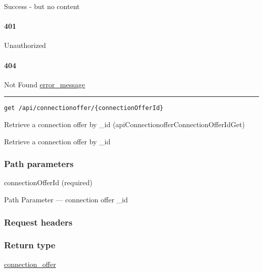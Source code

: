 Success - but no content \protect\hyperlink{}{}

\hypertarget{section-361}{%
\paragraph{401}\label{section-361}}

Unauthorized \protect\hyperlink{}{}

\hypertarget{section-362}{%
\paragraph{404}\label{section-362}}

Not Found \protect\hyperlink{error_message}{error\_message}

\begin{center}\rule{0.5\linewidth}{\linethickness}\end{center}

\protect\hypertarget{apiConnectionofferConnectionOfferIdGet}{}{}

\begin{verbatim}
get /api/connectionoffer/{connectionOfferId}
\end{verbatim}

Retrieve a connection offer by \_id
({apiConnectionofferConnectionOfferIdGet})

Retrieve a connection offer by \_id

\hypertarget{path-parameters-58}{%
\subsubsection{Path parameters}\label{path-parameters-58}}

connectionOfferId (required)

{Path Parameter} --- connection offer \_id

\hypertarget{request-headers-61}{%
\subsubsection{Request headers}\label{request-headers-61}}

\hypertarget{return-type-84}{%
\subsubsection{Return type}\label{return-type-84}}

\protect\hyperlink{connection_offer}{connection\_offer}

